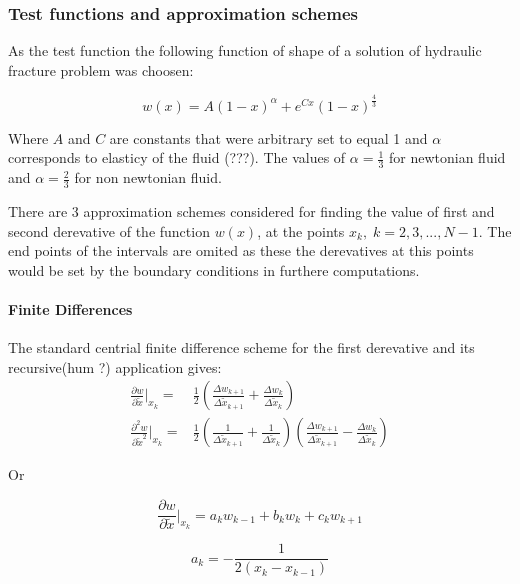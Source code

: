 \subsubsection{Test functions and approximation schemes}
As the test function the following function of shape of a solution of hydraulic fracture problem was choosen:

\begin{equation}
w(x)=A(1-x)^{\alpha}+e^{Cx}(1-x)^{\frac{4}{3}}
\end{equation} 

Where $A$ and $C$ are constants that were arbitrary set to equal 1 and $\alpha$ corresponds to elasticy of the fluid (???). The values of $\alpha=\frac{1}{3}$ for newtonian fluid and $\alpha=\frac{2}{3}$ for non newtonian fluid.

There are 3 approximation schemes considered for finding the value of first and second derevative of the function $w(x)$, at the points $x_k,\; k=2,3,...,N-1$. The end points of the intervals are omited as these the derevatives at this points would be set by the boundary conditions in furthere computations.

\paragraph{Finite Differences}
The standard centrial finite difference scheme for the first derevative and its recursive(hum ?) application gives:
\begin{equation}
\begin{split}\label{FD}
\frac{\partial w}{\partial \tilde x}|_{x_k}=&\frac{1}{2}
\left(\frac{\Delta w_{k+1}}{\Delta \tilde x_{k+1}}
+\frac{\Delta w_{k}}{\Delta \tilde x_{k}}\right)
\\
\frac{\partial^2 w}{\partial \tilde x^2}|_{x_k}=&\frac{1}{2}
\left(\frac{1}{\Delta \tilde x_{k+1}}+\frac{1}{\Delta \tilde x_{k}}\right)
\left(\frac{\Delta w_{k+1}}{\Delta \tilde x_{k+1}}-\frac{\Delta w_{k}}{\Delta \tilde x_{k}}\right)
\end{split}
\end{equation}

Or

\begin{equation}
\frac{\partial w}{\partial \tilde x}|_{x_k}=a_k w_{k-1}+b_k w_{k}+c_k w_{k+1}
\end{equation}

\begin{equation}
a_k=-\frac{1}{2(x_k-x_{k-1})}
\end{equation}

